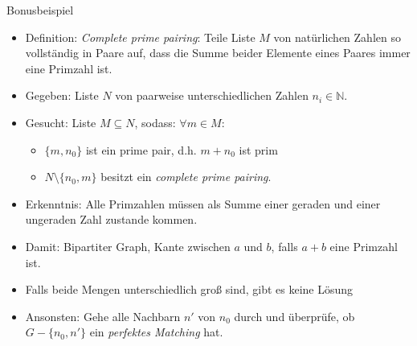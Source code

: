 \documentclass[18pt]{beamer}
\begin{document}
\begin{frame}{Bonusbeispiel}
\begin{itemize}
\item Definition: \textit{Complete prime pairing}: Teile Liste $M$ von nat\"urlichen Zahlen so vollst\"andig in Paare auf,
dass die Summe beider Elemente eines Paares immer eine Primzahl ist.
\item Gegeben: Liste $N$ von paarweise unterschiedlichen Zahlen $n_{i} \in \mathbb{N}$.
\item Gesucht: Liste $M \subseteq N$, sodass: $\forall m \in M$:
\begin{itemize}
	\item  $\{m, n_{0}\}$ ist ein prime pair, d.h. $m + n_{0}$ ist prim
	\item $N \setminus \{n_{0}, m\}$ besitzt ein \textit{complete prime pairing}.
\end{itemize}
\pause
\item Erkenntnis: Alle Primzahlen m\"ussen als Summe einer geraden und einer ungeraden Zahl zustande kommen.
\item Damit: Bipartiter Graph, Kante zwischen $a$ und $b$, falls $a + b$ eine Primzahl ist.
\item Falls beide Mengen unterschiedlich gro{\ss} sind, gibt es keine L\"osung
\item Ansonsten: Gehe alle Nachbarn $n'$ von $n_{0}$ durch und \"uberpr\"ufe, ob $G - \{n_{0}, n'\}$ ein \textit{perfektes Matching} hat.
\end{itemize}
\end{frame}
\end{document}
